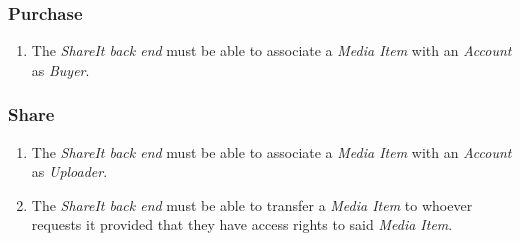 \documentclass[../report.tex]{subfiles}
\begin{document}
\noindent
\subsubsection{Purchase}

\begin{enumerate}[label=FR-\twodigits*,resume] 
\item The \textit{ShareIt back end} must be able to associate a \textit{Media Item} with an \textit{Account} as \textit{Buyer}.
\end{enumerate}


\subsubsection{Share}

\begin{enumerate}[label=FR-\twodigits*,resume] 
\item The \textit{ShareIt back end} must be able to associate a \textit{Media Item} with an \textit{Account} as \textit{Uploader}.

\item The \textit{ShareIt back end} must be able to transfer a \textit{Media Item} to whoever requests it provided that they have access rights to said \textit{Media Item}.
\end{enumerate}
\end{document}
